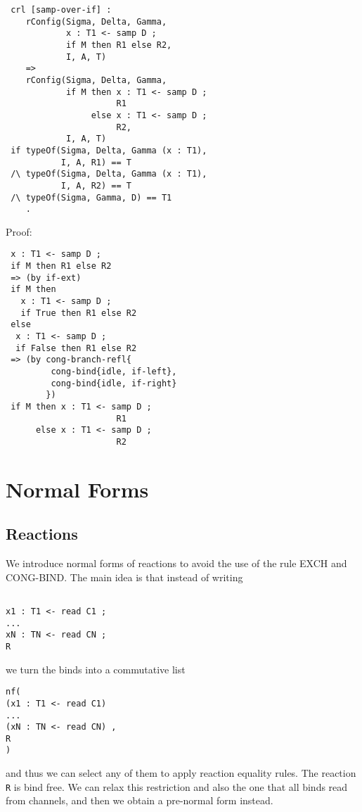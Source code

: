\documentclass{article}
\begin{document}
\begin{itemize}
\begin{lstlisting}
 crl [samp-over-if] :
    rConfig(Sigma, Delta, Gamma, 
            x : T1 <- samp D ; 
            if M then R1 else R2, 
            I, A, T) 
    => 
    rConfig(Sigma, Delta, Gamma, 
            if M then x : T1 <- samp D ; 
                      R1
                 else x : T1 <- samp D ; 
                      R2, 
            I, A, T)
 if typeOf(Sigma, Delta, Gamma (x : T1), 
           I, A, R1) == T
 /\ typeOf(Sigma, Delta, Gamma (x : T1), 
           I, A, R2) == T          
 /\ typeOf(Sigma, Gamma, D) == T1                       
    . 
\end{lstlisting}

Proof:

\begin{lstlisting}
 x : T1 <- samp D ; 
 if M then R1 else R2
 => (by if-ext)
 if M then 
   x : T1 <- samp D ; 
   if True then R1 else R2
 else
  x : T1 <- samp D ; 
  if False then R1 else R2
 => (by cong-branch-refl{
         cong-bind{idle, if-left}, 
         cong-bind{idle, if-right}
        })
 if M then x : T1 <- samp D ; 
                      R1
      else x : T1 <- samp D ; 
                      R2  
\end{lstlisting}

\end{itemize}

\section{Normal Forms}

\subsection{Reactions}

We introduce normal forms of reactions to avoid the use of the rule EXCH and
CONG-BIND. 
The main idea is that instead of writing 
\begin{lstlisting}

x1 : T1 <- read C1 ; 
...
xN : TN <- read CN ;
R

\end{lstlisting}

\noindent we turn the binds into a commutative list
 \begin{lstlisting}
nf(
(x1 : T1 <- read C1)
...
(xN : TN <- read CN) ,
R
)
\end{lstlisting}
\noindent and thus we can select any of them to apply reaction equality rules.
The reaction \verb+R+ is bind free. We can relax this restriction and also the one that all binds read from channels, and then we obtain a pre-normal form instead. 
\end{document}
